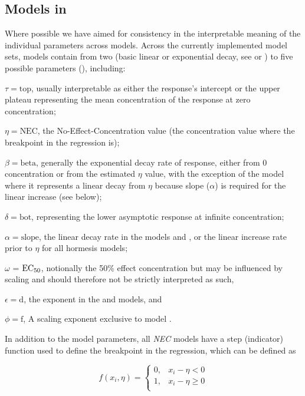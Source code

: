 \documentclass[
  shortnames]{jss}
\begin{document}
\subsection[Models in bayesnec]{Models in }\label{mdbnc}

Where possible we have aimed for consistency in the interpretable meaning of the individual parameters across models. Across the currently implemented model sets, models contain from two (basic linear or exponential decay, see  or ) to five possible parameters (), including:

\(\tau = \text{top}\), usually interpretable as either the response's intercept or the upper plateau representing the mean concentration of the response at zero concentration;

\(\eta = \text{NEC}\), the No-Effect-Concentration value (the concentration value where the breakpoint in the regression is);

\(\beta = \text{beta}\), generally the exponential decay rate of response, either from 0 concentration or from the estimated \(\eta\) value, with the exception of the  model where it represents a linear decay from \(\eta\) because slope (\(\alpha\)) is required for the linear increase (see below);

\(\delta = \text{bot}\), representing the lower asymptotic response at infinite concentration;

\(\alpha = \text{slope}\), the linear decay rate in the models  and , or the linear increase rate prior to \(\eta\) for all hormesis models;

\(\omega\) = \(\text{EC\textsubscript{50}}\), notionally the 50\% effect concentration but may be influenced by scaling and should therefore not be strictly interpreted as such,

\(\epsilon = \text{d}\), the exponent in the  and  models, and

\(\phi = \text{f}\), A scaling exponent exclusive to model .

In addition to the model parameters, all \emph{NEC} models have a step (indicator) function used to define the breakpoint in the regression, which can be defined as

\[
f(x_i, \eta) = \begin{cases} 
      0, & x_i - \eta < 0 \\
      1, & x_i - \eta \geq 0 \\
   \end{cases}
\]
\end{document}
